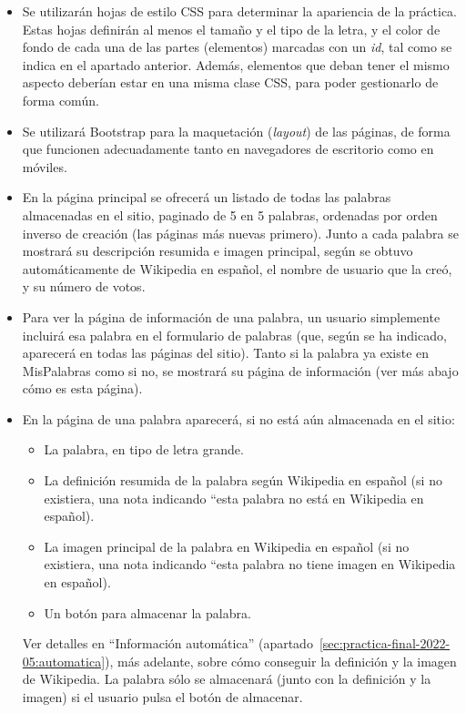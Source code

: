 \begin{itemize}
\item Se utilizarán hojas de estilo CSS para determinar la apariencia de la práctica. Estas hojas definirán al menos el tamaño y el tipo de la letra, y el color de fondo de cada una de las partes (elementos) marcadas con un \emph{id}, tal como se indica en el apartado anterior. Además, elementos que deban tener el mismo aspecto deberían estar en una misma clase CSS, para poder gestionarlo de forma común.

\item Se utilizará Bootstrap para la maquetación (\emph{layout}) de las páginas, de forma que funcionen adecuadamente tanto en navegadores de escritorio como en móviles.

\item En la página principal se ofrecerá un listado de todas las palabras almacenadas en el sitio, paginado de 5 en 5 palabras, ordenadas por orden inverso de creación (las páginas más nuevas primero). Junto a cada palabra se mostrará su descripción resumida e imagen principal, según se obtuvo automáticamente de Wikipedia en español, el nombre de usuario que la creó, y su número de votos.

\item Para ver la página de información de una palabra, un usuario simplemente incluirá esa palabra en el formulario de palabras (que, según se ha indicado, aparecerá en todas las páginas del sitio). Tanto si la palabra ya existe en MisPalabras como si no, se mostrará su página de información (ver más abajo cómo es esta página).

\item En la página de una palabra aparecerá, si no está aún almacenada en el sitio:
  \begin{itemize}
  \item La palabra, en tipo de letra grande.
  \item La definición resumida de la palabra según Wikipedia en español (si no existiera, una nota indicando ``esta palabra no está en Wikipedia en español).
  \item La imagen principal de la palabra en Wikipedia en español (si no existiera, una nota indicando ``esta palabra no tiene imagen en Wikipedia en español).
  \item Un botón para almacenar la palabra.
  \end{itemize}

  Ver detalles en ``Información automática'' (apartado~\ref{sec:practica-final-2022-05:automatica}), más adelante, sobre cómo conseguir la definición y la imagen de Wikipedia. La palabra sólo se almacenará (junto con la definición y la imagen) si el usuario pulsa el botón de almacenar.


\end{itemize}
